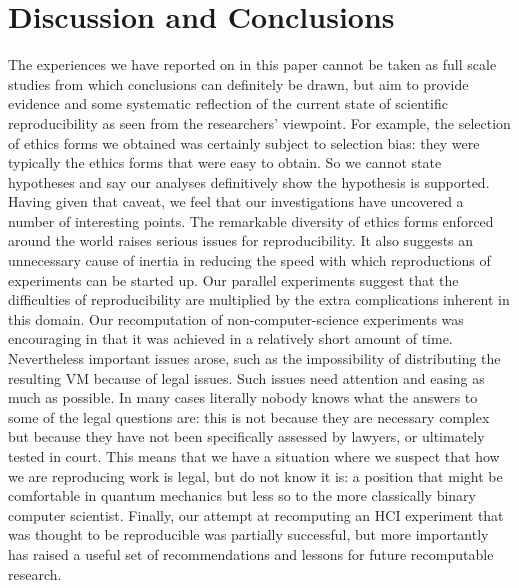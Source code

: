 \section{Discussion and Conclusions}
\label{s:discussion}

The experiences we have reported on in this paper cannot be taken as full scale studies from which conclusions can definitely be drawn, but aim to provide evidence and some systematic reflection of the current state of scientific reproducibility as seen from the researchers' viewpoint.  For example, the 
selection of ethics forms we obtained was certainly subject to selection bias: they were typically the ethics forms that were easy to obtain.  So we cannot state hypotheses and say our analyses definitively show the hypothesis is supported.   Having given that caveat, we feel that our investigations have uncovered a number of interesting points.  The remarkable diversity of ethics forms enforced around the world raises serious issues for reproducibility.  It also suggests an unnecessary cause of inertia in reducing the speed with which reproductions of experiments can be started up.  Our parallel experiments suggest that the difficulties of reproducibility are 
multiplied by the extra complications inherent in this domain.  Our
recomputation of non-computer-science experiments was encouraging in
that it was achieved in a relatively short amount of time.
Nevertheless important issues arose, such as the impossibility of
distributing the resulting VM because of legal issues. 
Such issues need attention and easing as much as possible.  In many
cases literally nobody knows what the answers to some of the legal
questions are: this is not because they are necessary complex but
because they have not been specifically assessed by lawyers, or
ultimately tested in court.  This means that we have a situation where
we suspect that how we are reproducing work is legal, but do not know
it is: a position that might be comfortable in quantum mechanics but
less so to the more classically binary computer scientist. Finally,
our attempt at recomputing an HCI experiment that was thought to be
reproducible was partially successful, but more importantly has raised
a useful set of recommendations and lessons for future recomputable
research.
